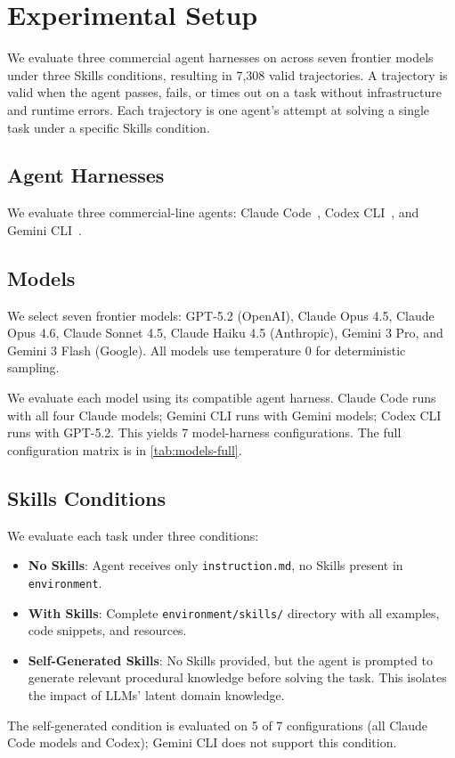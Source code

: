 \section{Experimental Setup}
\label{sec:experimentation}

We evaluate three commercial agent harnesses on \benchmarkName{} across seven frontier models under three Skills conditions, resulting in 7,308 valid trajectories.
A trajectory is valid when the agent passes, fails, or times out on a task without infrastructure and runtime errors. Each trajectory is one agent's attempt at solving a single task under a specific Skills condition.

\subsection{Agent Harnesses}

We evaluate three commercial-line agents: Claude Code~\citep{anthropic2025claudecode}, Codex CLI~\citep{openai2025codexcli}, and Gemini CLI~\citep{google2025geminicli}.

\subsection{Models}

We select seven frontier models: GPT-5.2 (OpenAI), Claude Opus 4.5, Claude Opus 4.6, Claude Sonnet 4.5, Claude Haiku 4.5 (Anthropic), Gemini 3 Pro, and Gemini 3 Flash (Google). All models use temperature 0 for deterministic sampling.

We evaluate each model using its compatible agent harness. Claude Code runs with all four Claude models; Gemini CLI runs with Gemini models; Codex CLI runs with GPT-5.2. This yields 7 model-harness configurations. The full configuration matrix is in \autoref{tab:models-full}.

\subsection{Skills Conditions}

We evaluate each task under three conditions:
\begin{itemize}[nosep,leftmargin=*]
    \item \textbf{No Skills}: Agent receives only \texttt{instruction.md}, no Skills present in \texttt{environment}.
    \item \textbf{With Skills}: Complete \texttt{environment/skills/} directory with all examples, code snippets, and resources.
    \item \textbf{Self-Generated Skills}: No Skills provided, but the agent is prompted to generate relevant procedural knowledge before solving the task. This isolates the impact of LLMs' latent domain knowledge.
\end{itemize}
The self-generated condition is evaluated on 5 of 7 configurations (all Claude Code models and Codex); Gemini CLI does not support this condition.

